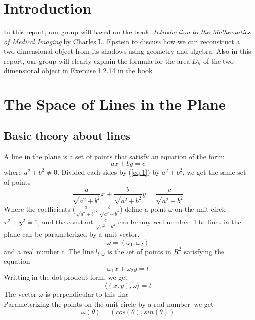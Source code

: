 \documentclass[a4paper]{article}
\begin{document}
\section{Introduction}
In this report, our group will based on the book:\textit{ Introduction to the Mathematics of Medical Imaging} by Charles L. Epstein to discuss how we can reconstruct a two-dimensional object from its shadows using geometry and algebra. Also in this report, our group will clearly explain the formula for the area $D_h$ of the two-dimensional object in Exercise 1.2.14 in the book
\section{The Space of Lines in the Plane}
\subsection{Basic theory about lines}
A line in the plane is a set of points that satisfy an equation of the form:
\begin{equation}\label{eq:1}
    ax + by = c
\end{equation}
where $a^2+b^2\neq 0$. Divided each sides by (\ref{eq:1}) by $a^2+b^2$, we get the same set of points
\begin{equation*}
    \frac{a}{\sqrt{a^2+b^2}}x + \frac{b}{\sqrt{a^2+b^2}}y = \frac{c}{\sqrt{a^2+b^2}}
\end{equation*}
Where the coefficients ($\frac{a}{\sqrt{a^2+b^2}},\frac{b}{\sqrt{a^2+b^2}}$) define a point $\omega$ on the unit circle $x^2 + y^2 = 1$, and the constant $\frac{c}{\sqrt{a^2+b^2}}$ can be any real number. The lines in the plane can be parameterized by a unit vector.
\begin{equation*}
    \omega = (\omega_1,\omega_2)
\end{equation*}
and a real number t. The line $l_{t,\omega}$ is the set of points in $R^2$ satisfying the equation
\begin{equation*}
    \omega_1 x + \omega_2 y = t
\end{equation*}
Writting in the dot prodcut form, we get
\begin{equation}\label{eq:3}
    \langle (x,y), \omega \rangle = t
\end{equation}
The vector $\omega$ is perpendicular to this line\\ 
Parameterizing the points on the unit circle by a real number, we get
\begin{equation}\label{paraomega}
    \omega(\theta) = (cos(\theta),sin(\theta))
\end{equation}
\end{document}
